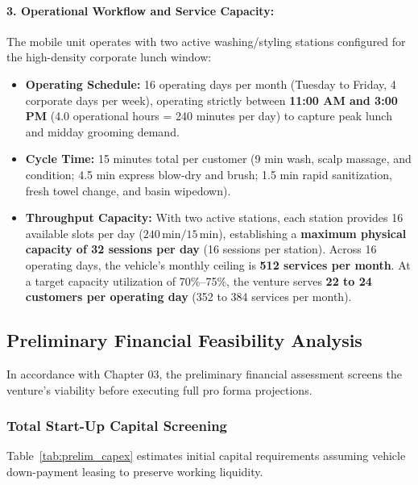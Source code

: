 \paragraph{3. Operational Workflow and Service Capacity:}
The mobile unit operates with two active washing/styling stations configured for the high-density corporate lunch window:
\begin{itemize}[leftmargin=1.5em, itemsep=0.15em]
    \item \textbf{Operating Schedule:} 16 operating days per month (Tuesday to Friday, 4 corporate days per week), operating strictly between \textbf{11:00 AM and 3:00 PM} (4.0 operational hours = 240 minutes per day) to capture peak lunch and midday grooming demand.
    \item \textbf{Cycle Time:} 15 minutes total per customer (9 min wash, scalp massage, and condition; 4.5 min express blow-dry and brush; 1.5 min rapid sanitization, fresh towel change, and basin wipedown).
    \item \textbf{Throughput Capacity:} With two active stations, each station provides 16 available slots per day ($240\,\text{min} / 15\,\text{min}$), establishing a \textbf{maximum physical capacity of 32 sessions per day} (16 sessions per station). Across 16 operating days, the vehicle's monthly ceiling is \textbf{512 services per month}. At a target capacity utilization of 70\%--75\%, the venture serves \textbf{22 to 24 customers per operating day} (352 to 384 services per month).
\end{itemize}

\subsection{Preliminary Financial Feasibility Analysis}
\label{subsec:prelim_financial_feasibility}

In accordance with Chapter 03, the preliminary financial assessment screens the venture's viability before executing full pro forma projections.

\subsubsection{Total Start-Up Capital Screening}
Table~\ref{tab:prelim_capex} estimates initial capital requirements assuming vehicle down-payment leasing to preserve working liquidity.


